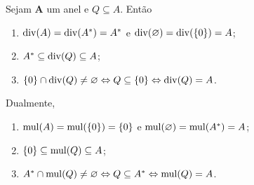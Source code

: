 \begin{prop}
Sejam $\bm A$ um anel e $Q \subseteq A$. Então
	\begin{enumerate}
	\item $\operatorname{div}(A) = \operatorname{div}(A^*) = A^*$ e $\operatorname{div}(\varnothing) = \operatorname{div}(\{0\}) = A$;
	\item $A^* \subseteq \operatorname{div}(Q) \subseteq A$;
	\item $\{0\} \cap \operatorname{div}(Q) \neq \varnothing \Leftrightarrow Q \subseteq \{0\} \Leftrightarrow \operatorname{div}(Q)=A$.
	\end{enumerate}

	Dualmente,
	\begin{enumerate}
	\item $\operatorname{mul}(A) = \operatorname{mul}(\{0\}) = \{0\}$ e $\operatorname{mul}(\varnothing) = \operatorname{mul}(A^*) = A$;
	\item $\{0\} \subseteq \operatorname{mul}(Q) \subseteq A$;
	\item $A^* \cap \operatorname{mul}(Q) \neq \varnothing \Leftrightarrow Q \subseteq A^* \Leftrightarrow \operatorname{mul}(Q) = A$.
	\end{enumerate}
\end{prop}
